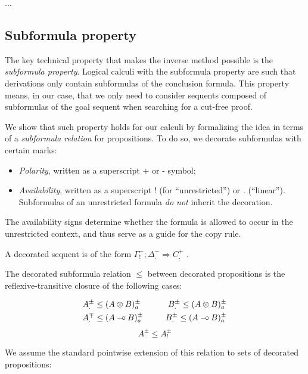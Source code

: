 \documentclass{article}
\theoremstyle{definition}
\def\limp {\mathbin{{-}\mkern-3.5mu{\circ}}}
\begin{document}
...

\subsection{Subformula property}

The key technical property that makes the inverse method possible is the
\emph{subformula property}. Logical calculi with the subformula property are
such that derivations only contain subformulas of the conclusion formula. This
property means, in our case, that we only need to consider sequents composed of
subformulas of the goal sequent when searching for a cut-free proof.

We show that such property holds for our calculi by formalizing the idea in
terms of a \emph{subformula relation} for propositions. To do so, we decorate
subformulas with certain marks:

\begin{itemize}
\item \emph{Polarity}, written as a superscript + or - symbol;
\item \emph{Availability}, written as a superscript ! (for ``unrestricted'') or
  . (``linear''). Subformulas of an unrestricted formula \emph{do not} inherit
  the decoration.
\end{itemize}

The availability signs determine whether the formula is allowed to occur in the
unrestricted context, and thus serve as a guide for the copy rule.

\begin{definition}
  A decorated sequent is of the form $\Gamma^-_! ; \Delta^-_. \Longrightarrow
  C^+_.$ .
\end{definition}

\begin{definition}
  The decorated subformula relation $\leq$ between decorated propositions is the
  reflexive-transitive closure of the following cases:

  \begin{alignat*}{2}
    & A^{\pm}_{.} \leq (A \otimes B)_a^{\pm} \qquad & B^{\pm}_{.} \leq (A \otimes
    B)_a^{\pm} \\
    & A^{\mp}_{.} \leq (A \limp B)_a^{\pm} & B^{\pm}_{.} \leq (A \limp
    B)_a^{\pm}
  \end{alignat*}
  \[
    A^{\pm}_{.} \leq A^{\pm}_{!}
  \]
\end{definition}

We assume the standard pointwise extension of this relation to sets of decorated
propositions:
\end{document}
